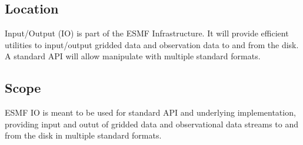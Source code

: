 \subsection{Location}

Input/Output (IO) is part of the ESMF Infrastructure.  It will provide
efficient utilities to input/output gridded data and observation data
to and from the disk. A standard API will allow manipulate with multiple
standard formats.

\subsection{Scope}

ESMF IO is meant to be used for standard API and underlying
implementation, providing input and outut of gridded data and
observational data streams to and from the disk in multiple standard
formats.














